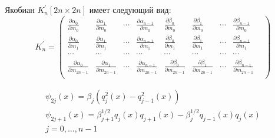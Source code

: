 Якобиан $K^{'}_n[2n\times 2n]$ имеет следующий вид:
\begin{equation}
K^{'}_n=
\left(
\begin{array}{ccccccccccccc}
\displaystyle\frac{\partial \alpha_0} {\partial m_0} &
\displaystyle\frac{\partial \alpha_1} {\partial m_0} & \cdots &
\displaystyle\frac{\partial \alpha_{n-1}} {\partial m_0} &
\displaystyle\frac{\partial \beta_0} {\partial m_0} &
\displaystyle\frac{\partial \beta_1} {\partial m_0} & \cdots &
\displaystyle\frac{\partial \beta_{n-1}} {\partial m_0} \\

\displaystyle\frac{\partial \alpha_0} {\partial m_1} &
\displaystyle\frac{\partial \alpha_1} {\partial m_1} & \cdots &
\displaystyle\frac{\partial \alpha_{n-1}} {\partial m_1} &
\displaystyle\frac{\partial \beta_0} {\partial m_1} &
\displaystyle\frac{\partial \beta_1} {\partial m_1} & \cdots &
\displaystyle\frac{\partial \beta_{n-1}} {\partial m_1} \\
\cdots & \cdots & \cdots & \cdots & \cdots & \cdots & \cdots & \cdots & \\
\displaystyle\frac{\partial \alpha_0} {\partial m_{2n-1}} &
\displaystyle\frac{\partial \alpha_1} {\partial m_{2n-1}} & \cdots &
\displaystyle\frac{\partial \alpha_{n-1}} {\partial m_{2n-1}} &
\displaystyle\frac{\partial \beta_0} {\partial m_{2n-1}} &
\displaystyle\frac{\partial \beta_1} {\partial m_{2n-1}} & \cdots &
\displaystyle\frac{\partial \beta_{n-1}} {\partial m_{2n-1}} \\
\end{array}
\right)
\end{equation}

\begin{eqnarray}
\psi_{2j}(x)=\beta_j(q^2_j(x)-q^2_{j-1}(x)) \nonumber \\
\psi_{2j+1}(x)=\beta_{j+1}^{1/2}q_j(x)q_{j+1}(x)-\beta_j^{1/2}q_{j-1}(x)q_{j}(x) \nonumber \\
 j=0,\ldots,n-1 \nonumber
\end{eqnarray}

